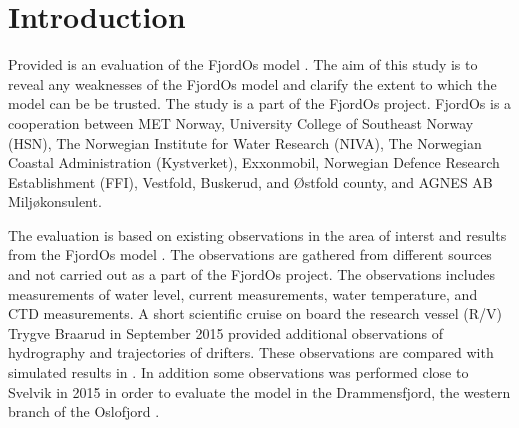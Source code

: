 
\section{Introduction}
Provided is an evaluation of the FjordOs model \citep{roed:etal:2016}. The aim of this study is to reveal any weaknesses of the FjordOs model and clarify the extent to which the model can be be trusted. The study is a part of the FjordOs project. FjordOs is a cooperation between MET Norway, University College of Southeast Norway (HSN), The Norwegian Institute for Water Research (NIVA), The Norwegian Coastal Administration (Kystverket), Exxonmobil, Norwegian Defence Research Establishment (FFI), Vestfold, Buskerud, and \O stfold county, and AGNES AB Milj\o konsulent.

The evaluation is based on existing observations in the area of interst and results from the FjordOs model \citep{roed:etal:2016}. The observations are gathered from different sources and not carried out as a part of the FjordOs project. The observations includes measurements of water level, current measurements, water temperature, and CTD measurements. A short scientific cruise on board the research vessel (R/V) Trygve Braarud in September 2015 provided additional observations of hydrography and trajectories of drifters. These observations are compared with simulated results in \cite{hjelm:etal:2016}. In addition some observations was performed close to Svelvik in 2015 in order to evaluate the model in the Drammensfjord, the western branch of the Oslofjord \citep{staalstrom:2017}. 



\newpage
